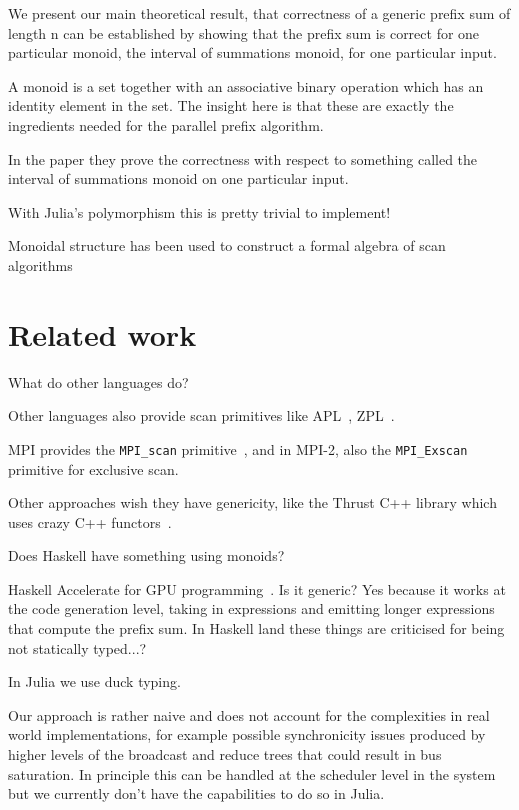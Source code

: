 \documentclass{sig-alternate}
\newcommand{\code}[1]{\texttt{#1}}
\begin{document}
\cite{Chong2014}
We present our main theoretical result, that
correctness of a generic prefix sum of length n can be established
by showing that the prefix sum is correct for one particular monoid,
the interval of summations monoid, for one particular input.

A monoid is a set together with an associative binary operation which has an identity element in the set. The insight here is that these are exactly the ingredients needed for the parallel prefix algorithm.

In the paper they prove the correctness with respect to something called the interval of summations monoid on one particular input.

With Julia's polymorphism this is pretty trivial to implement!

Monoidal structure has been used to construct a formal algebra of scan algorithms~\cite{Hinze2004}

\section{Related work}

What do other languages do?

Other languages also provide scan primitives like APL~\cite{Iverson1962}, ZPL~\cite{Chamberlain2000}.

MPI provides the \code{MPI\_scan} primitive~\cite{Snir1995,MPI}, and in MPI-2, also the \code{MPI\_Exscan} primitive for exclusive scan.~\cite{MPI2}

Other approaches wish they have genericity, like the Thrust C++ library which uses crazy C++ functors~\cite{Bell2012}.

Does Haskell have something using monoids?

Haskell Accelerate for GPU programming~\cite{Chakravarty2011}. Is it generic? Yes because it works at the code generation level, taking in expressions and emitting longer expressions that compute the prefix sum. In Haskell land these things are criticised for being not statically typed...?

In Julia we use duck typing.

Our approach is rather naive and does not account for the complexities in real world implementations, for example possible synchronicity issues produced by higher levels of the broadcast and reduce trees that could result in bus saturation. In principle this can be handled at the scheduler level in the system but we currently don't have the capabilities to do so in Julia.
\end{document}
